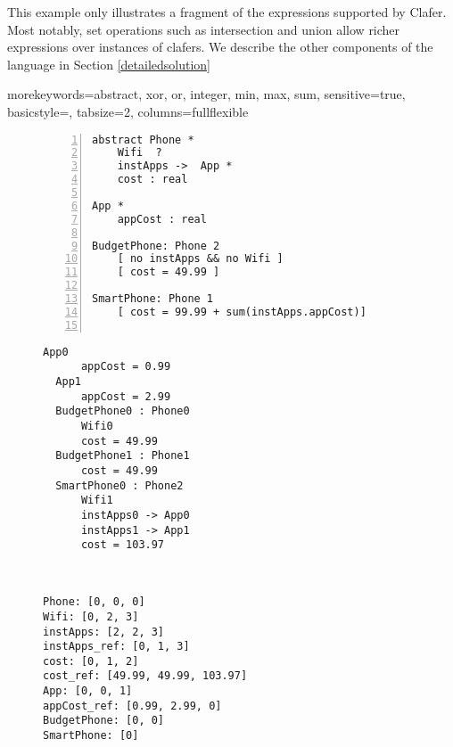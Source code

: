 \documentclass{easychair}
\begin{document}
\indent This example only illustrates a fragment of the expressions supported by Clafer. Most notably, set operations such as intersection and union allow richer expressions over instances of clafers. We describe the other components of the language in Section \ref{detailedsolution}

{morekeywords={abstract, xor, or, integer, min, max, sum},
sensitive=true,
basicstyle={\sffamily\small},
tabsize=2,
columns=fullflexible
}


\begin{figure}[!t]
\par\noindent
\begin{minipage}[t]{.33\textwidth}
\begin{lstlisting}[language=clafer, numbers=left, caption=Clafer specification of two types of phones and apps., label={listing:ClaferPhone}]
abstract Phone *
	Wifi  ?
	instApps ->  App *
	cost : real

App *
	appCost : real

BudgetPhone: Phone 2
	[ no instApps && no Wifi ]
	[ cost = 49.99 ]	

SmartPhone: Phone 1
	[ cost = 99.99 + sum(instApps.appCost)]	
 
\end{lstlisting}%
\end{minipage}%
\hfill
\begin{minipage}[t]{.32\textwidth}
\begin{lstlisting}[language=clafer, caption=A generated model of a mobile phone and its apps in Clafer., label={listing:ClaferPhoneInstance}]
  App0
	  appCost = 0.99
  App1
	  appCost = 2.99
  BudgetPhone0 : Phone0
	  Wifi0
	  cost = 49.99
  BudgetPhone1 : Phone1
  	  cost = 49.99
  SmartPhone0 : Phone2
	  Wifi1
	  instApps0 -> App0
	  instApps1 -> App1
	  cost = 103.97
\end{lstlisting}%
\end{minipage}%
\hfill
\begin{minipage}[t]{.32\textwidth}
\begin{lstlisting}[language=clafer, caption=The variables associated with each clafer in Z3\, corresponding to Listing 2., label={listing:ClaferPhoneZ3}]


Phone: [0, 0, 0]
Wifi: [0, 2, 3]
instApps: [2, 2, 3]
instApps_ref: [0, 1, 3]
cost: [0, 1, 2]
cost_ref: [49.99, 49.99, 103.97]
App: [0, 0, 1]
appCost_ref: [0.99, 2.99, 0]
BudgetPhone: [0, 0]
SmartPhone: [0]
\end{lstlisting}%
\end{minipage}%
\end{figure}
\end{document}
